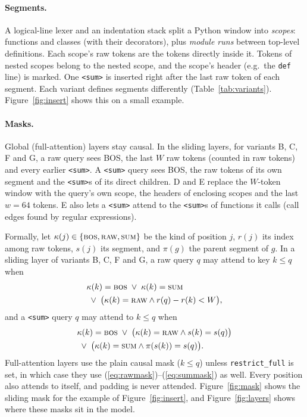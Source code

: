 \documentclass[11pt]{article}
\newcommand{\sumtok}{\texttt{<sum>}}
\begin{document}
\paragraph{Segments.}
A logical-line lexer and an indentation stack split a Python window into
\emph{scopes}: functions and classes (with their decorators), plus
\emph{module runs} between top-level definitions. Each scope's raw tokens are
the tokens directly inside it. Tokens of nested scopes belong to the nested
scope, and the scope's header (e.g.\ the \texttt{def} line) is marked. One
\sumtok{} is inserted right after the last raw token of each segment. Each
variant defines segments differently (Table~\ref{tab:variants}).
Figure~\ref{fig:insert} shows this on a small example.

\paragraph{Masks.}
Global (full-attention) layers stay causal. In the sliding layers, for
variants B, C, F and G, a raw query sees BOS, the last $W$ raw tokens (counted
in raw tokens) and every earlier \sumtok{}. A \sumtok{} query sees BOS, the raw
tokens of its own segment and the \sumtok{}s of its direct children. D and E
replace the $W$-token window with the query's own scope, the headers of
enclosing scopes and the last $w=64$ tokens. E also lets a \sumtok{} attend to
the \sumtok{}s of functions it calls (call edges found by regular expressions).

Formally, let $\kappa(j)\in\{\textsc{bos},\textsc{raw},\textsc{sum}\}$ be the
kind of position $j$, $r(j)$ its index among raw tokens, $s(j)$ its segment,
and $\pi(g)$ the parent segment of $g$. In a sliding layer of variants B, C, F
and G, a raw query $q$ may attend to key $k\le q$ when
\begin{equation}
\begin{aligned}
&\kappa(k)=\textsc{bos} \;\lor\; \kappa(k)=\textsc{sum}\\
&\;\lor\; \bigl(\kappa(k)=\textsc{raw} \land r(q)-r(k)<W\bigr),
\end{aligned}
\label{eq:rawmask}
\end{equation}
and a \sumtok{} query $q$ may attend to $k\le q$ when
\begin{equation}
\begin{aligned}
&\kappa(k)=\textsc{bos} \;\lor\; \bigl(\kappa(k)=\textsc{raw}\land s(k)=s(q)\bigr)\\
&\;\lor\; \bigl(\kappa(k)=\textsc{sum}\land \pi(s(k))=s(q)\bigr).
\end{aligned}
\label{eq:summask}
\end{equation}
Full-attention layers use the plain causal mask ($k\le q$) unless
\texttt{restrict\_full} is set, in which case they use
(\ref{eq:rawmask})--(\ref{eq:summask}) as well. Every position also attends to
itself, and padding is never attended.
Figure~\ref{fig:mask} shows the sliding mask for the example of
Figure~\ref{fig:insert}, and Figure~\ref{fig:layers} shows where these masks
sit in the model.
\end{document}
